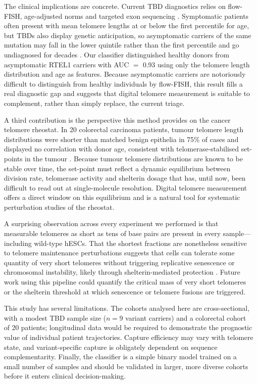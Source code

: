 \documentclass[11pt]{article}
\begin{document}
The clinical implications are concrete. Current TBD diagnostics relies
on flow-FISH, age-adjusted norms and targeted exon sequencing
\citep{alder2018diagnostic,armanios2012telomeres}. Symptomatic patients
often present with mean telomere lengths at or below the first
percentile for age, but TBDs also display genetic anticipation, so
asymptomatic carriers of the same mutation may fall in the lower
quintile rather than the first percentile and go undiagnosed for
decades \citep{walne2013constitutional,savage2008tinf2}. Our classifier
distinguished healthy donors from asymptomatic RTEL1 carriers with
AUC $=$ 0.93 using only the telomere length distribution and age as
features. Because asymptomatic carriers are notoriously difficult to
distinguish from healthy individuals by flow-FISH, this result fills a
real diagnostic gap and suggests that digital telomere measurement is
suitable to complement, rather than simply replace, the current triage.

A third contribution is the perspective this method provides on the
cancer telomere rheostat. In 20 colorectal carcinoma patients, tumour
telomere length distributions were shorter than matched benign
epithelia in 75\% of cases and displayed no correlation with donor age,
consistent with telomerase-stabilised set-points in the tumour
\citep{chiba2015cancer,barthel2017systematic,roka2023tumor}. Because
tumour telomere distributions are known to be stable over time, the
set-point must reflect a dynamic equilibrium between division rate,
telomerase activity and shelterin dosage that has, until now, been
difficult to read out at single-molecule resolution. Digital telomere
measurement offers a direct window on this equilibrium and is a natural
tool for systematic perturbation studies of the rheostat.

A surprising observation across every experiment we performed is that
measurable telomeres as short as tens of base pairs are present in
every sample---including wild-type hESCs. That the shortest fractions
are nonetheless sensitive to telomere maintenance perturbations
suggests that cells can tolerate some quantity of very short telomeres
without triggering replicative senescence or chromosomal instability,
likely through shelterin-mediated protection
\citep{palm2008howshelterin}. Future work using this pipeline could
quantify the critical mass of very short telomeres or the shelterin
threshold at which senescence or telomere fusions are triggered.

This study has several limitations. The cohorts analysed here are
cross-sectional, with a modest TBD sample size ($n{=}9$ variant
carriers) and a colorectal cohort of 20 patients; longitudinal data
would be required to demonstrate the prognostic value of individual
patient trajectories. Capture efficiency may vary with telomere state,
and variant-specific capture is obligately dependent on sequence
complementarity. Finally, the classifier is a simple binary model
trained on a small number of samples and should be validated in larger,
more diverse cohorts before it enters clinical decision-making.
\end{document}
